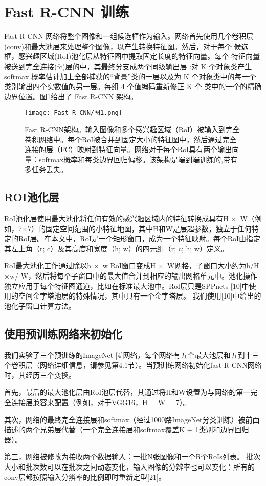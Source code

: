\section{Fast R-CNN 训练}
Fast R-CNN 网络将整个图像和一组候选框作为输入。网络首先使用几个卷积层(conv)和最大池层来处理整个图像，以产生转换特征图。然后，对于每个 候选框，感兴趣区域(RoI)池化层从特征图中提取固定长度的特征向量。每个 特征向量被送到完全连接(fc)层的中，其最终分支成两个同级输出层 :对 K 个对象类产生 softmax 概率估计加上全部捕获的“背景”类的一层以及为 K 个对象类中的每一个类别输出四个实数值的另一层。每组 4 个值编码重新修正 K 个 类中的一个的精确边界位置。图\ref{图1}给出了 Fast R-CNN 架构。

\begin{figure}[h]
    \centering
    \texttt{[image: Fast R-CNN/图1.png]}
    \caption{Fast R-CNN架构。输入图像和多个感兴趣区域（RoI）被输入到完全卷积网络中。每个RoI被合并到固定大小的特征图中，然后通过完全连接的层（FC）映射到特征向量。网络对于每个RoI具有两个输出向量：softmax概率和每类边界回归偏移。该架构是端到端训练的,带有多任务丢失。}
    \label{图1}
\end{figure}

\subsection {ROI池化层}
\par RoI池化层使用最大池化将任何有效的感兴趣区域内的特征转换成具有H × W（例如，7×7）的固定空间范围的小特征地图，其中H和W是层超参数，独立于任何特定的RoI层。在本文中，RoI是一个矩形窗口，成为一个特征映射。每个RoI由指定其左上角（r; c）及其高度和宽度（h; w）的四元组（r; c; h; w）定义。
\par RoI最大池化工作通过除以h × w RoI窗口变成H × W网格，子窗口大小约为h/H ×w/ W，然后将每个子窗口中的最大值合并到相应的输出网格单元中。池化操作独立应用于每个特征图通道，比如在标准最大池中。RoI层只是SPPnets [10]中使用的空间金字塔池层的特殊情况，其中只有一个金字塔层。 我们使用[10]中给出的池化子窗口计算方法。
\subsection {使用预训练网络来初始化}
\par 我们实验了三个预训练的ImageNet [4]网络，每个网络有五个最大池层和五到十三个卷积层（网络详细信息，请参见第4.1节）。当预训练网络初始化fast R-CNN网络时，其经历三个变换。
\par 首先，最后的最大池化层由RoI池层代替，其通过将H和W设置为与网络的第一完全连接层兼容来配置（例如，对于VGG16，H = W = 7）。
\par 其次，网络的最终完全连接层和softmax（经过1000路ImageNet分类训练）被前面描述的两个兄弟层代替（一个完全连接层和softmax覆盖K + 1类别和边界回归器）。
\par 第三，网络被修改为接收两个数据输入：一批N张图像和一个R个RoIs列表。 批次大小和批次数可以在批次之间动态变化，输入图像的分辨率也可以变化：所有的conv层都按照输入分辨率的比例即时重新定型[21]。

